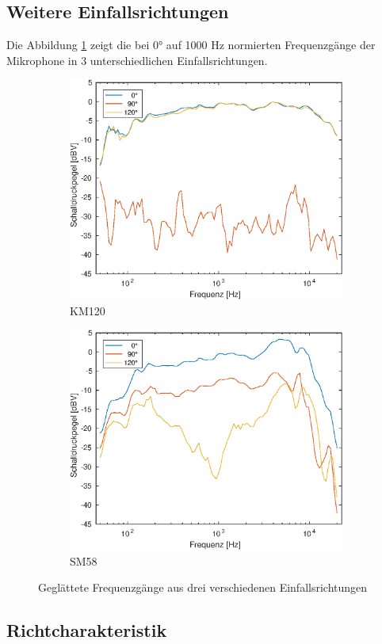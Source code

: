 \subsection{Weitere Einfallsrichtungen}

Die Abbildung \ref{fig:freq_all} zeigt die bei 0° auf 1000 Hz normierten Frequenzgänge der Mikrophone in 3 unterschiedlichen Einfallsrichtungen.

\begin{figure}[b]
    \centering
    \begin{subfigure}{.5\textwidth}
        \centering
        \caption{KM120}
        \includegraphics[width=0.95\linewidth]{Figures/km120_all}
    \end{subfigure}%
    \begin{subfigure}{.5\textwidth}
        \centering
        \caption{SM58}
        \includegraphics[width=0.95\linewidth]{Figures/sm58_all.eps}
    \end{subfigure}
    \caption{Geglättete Frequenzgänge aus drei verschiedenen Einfallsrichtungen}
    \label{fig:freq_all}
\end{figure}


\subsection{Richtcharakteristik}